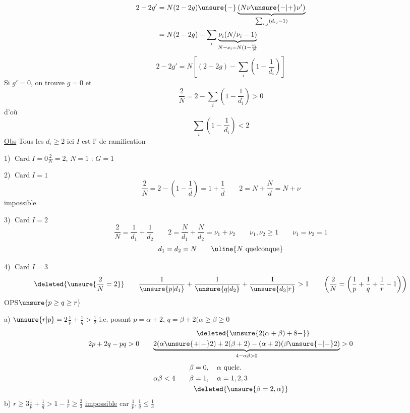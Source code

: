 \[
\begin{aligned}
2-2g'&=N(2-2g)\unsure{-}\underbrace{(N\nu\unsure{-|+}\nu')}_{\sum_{i,j}(d_{ij}-1)}\\
&=N(2-2g)-\sum_i\underbrace{\nu_i(N/\nu_i-1)}_{N-\nu_i=N(1-\frac{\nu_i}{N}}
\end{aligned}
\]
\qquad{}
\[
\boxed{2-2g'=N\left[(2-2g)-\sum_i\left(1-\frac1{d_i}\right)\right]}
\]
Si $g'=0$, on trouve $g=0$ et
\[
\boxed{\frac2N=2-\sum_i\left(1-\frac1{d_i}\right)>0}
\]
d'où
\[\sum_i\left(1-\frac1{d_i}\right)<2\]
\uline{Obs} Tous les $d_i\ge2$  ici $I$ est \uline{} l' de ramification

1) $\operatorname{Card}I=0$\qquad $\frac2N=2$, $N=1$ :  $G=1$

2) $\operatorname{Card}I=1$
\[
\frac2N=2-\left(1-\frac1d\right)=1+\frac1d\qquad
2=N+\frac Nd=N+\nu
\]
\uline{impossible}

3) $\operatorname{Card}I=2$
\[
\frac2N=\frac1{d_1}+\frac1{d_2}\qquad
2=\frac N{d_1}+\frac N{d_2}=\nu_1+\nu_2\qquad
\nu_1,\nu_2\ge1\qquad\nu_1=\nu_2=1
\]
\[d_1=d_2=N\qquad\uline{N\text{ quelconque}}\]

4) $\operatorname{Card}I=3$
\[
\deleted{\unsure{\frac2N=2}}\qquad
\frac1{\unsure{p|d_1}}+\frac1{\unsure{q|d_2}}+\frac1{\unsure{d_3|r}}>1
\qquad\left(\frac2N=\left(\frac1p+\frac1q+\frac1r-1\right)\right)
\]
OPS\qquad $\unsure{p\ge q\ge r}$

 a) $\unsure{r|p}=2$\qquad $\frac1p+\frac1q>\frac12$\qquad
 i.e. posant $p=\alpha+2$, $q=\beta+2$\qquad $(\alpha\ge\beta\ge0$
\margin{\deleted{$\unsure{\alpha}$}}
\[
2p+2q-pq>0\qquad
\begin{gathered}
\deleted{\unsure{2(\alpha+\beta)+8-}}\\
\underbrace{2(\alpha\unsure{+|-}2)+2(\beta+2)-(\alpha+2)(\beta\unsure{+|-}2)}_{4-\alpha\beta>0}>0
\end{gathered}
\]
\[
\alpha\beta<4\qquad
\begin{aligned}
\beta&=0,\quad\alpha\ \text{quelc.}\\
\beta&=1,\quad\alpha=1,2,3\\
&\deleted{\unsure{\beta=2,\alpha}}
\end{aligned}
\]
\diagram{\[
\left\{\begin{array}{lll}
(2,2,p)&p\ge2\ \text{quelc.}&N=2p\\
(2,3,3)&&N=12\\
(2,3,4)&&N=24\\
(2,3,5)&&N=60
\end{array}\right.
\]}
b) $r\ge3$\qquad $\frac1p+\frac1q>1-\frac1r\ge\frac23$\qquad
\uline{impossible} car $\frac1p,\frac1q\le\frac13$

